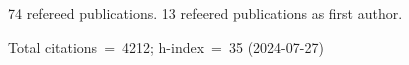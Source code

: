 74 refereed publications. 13 refeered publications as first author.

Total citations~=~4212; h-index~=~35 (2024-07-27)